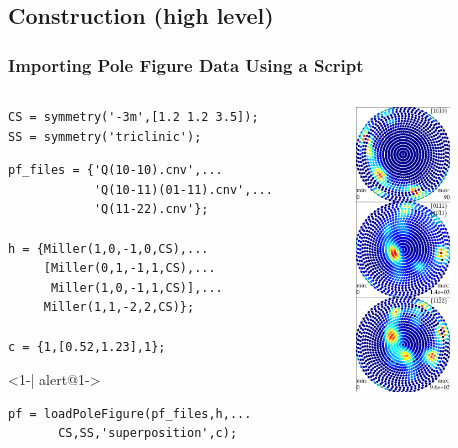 \documentclass{beamer}
\begin{document}
\subsection*{Construction (high level)}

\begin{frame}[fragile]
  \frametitle{Importing Pole Figure Data Using a Script}

  \begin{columns}
    \begin{column}{8.5cm}
      
\begin{lstlisting}
CS = symmetry('-3m',[1.2 1.2 3.5]);
SS = symmetry('triclinic');
\end{lstlisting}
  
\pause

\begin{lstlisting}
pf_files = {'Q(10-10).cnv',...
            'Q(10-11)(01-11).cnv',...
            'Q(11-22).cnv'};

h = {Miller(1,0,-1,0,CS),...
     [Miller(0,1,-1,1,CS),...
      Miller(1,0,-1,1,CS)],...
     Miller(1,1,-2,2,CS)};

c = {1,[0.52,1.23],1};
\end{lstlisting}        
      
\pause

      \begin{actionenv}<1-| alert@1->  
\begin{lstlisting}
pf = loadPoleFigure(pf_files,h,...
       CS,SS,'superposition',c);
\end{lstlisting}
      \end{actionenv}
  
    \end{column}

    \begin{column}{3cm}
      \includegraphics[width=2.5cm]{pic/pforig}
    \end{column}
    
  \end{columns}
  
\end{frame}
\end{document}
